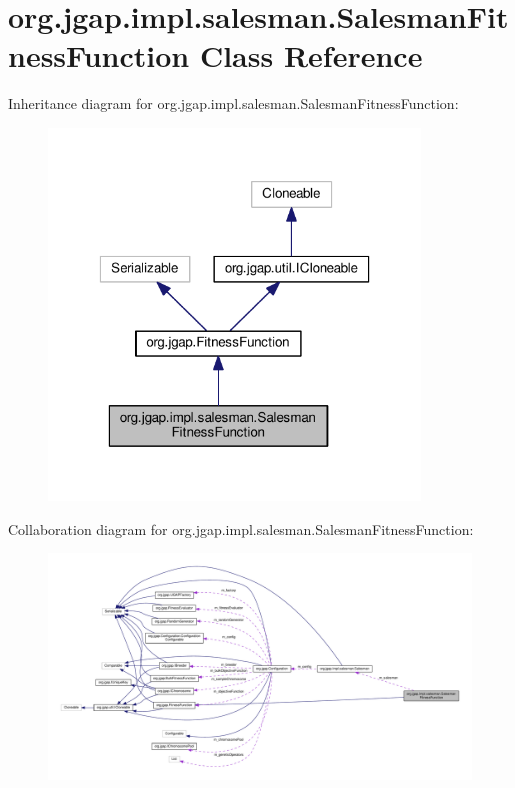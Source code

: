 \hypertarget{classorg_1_1jgap_1_1impl_1_1salesman_1_1_salesman_fitness_function}{\section{org.\-jgap.\-impl.\-salesman.\-Salesman\-Fitness\-Function Class Reference}
\label{classorg_1_1jgap_1_1impl_1_1salesman_1_1_salesman_fitness_function}
}


Inheritance diagram for org.\-jgap.\-impl.\-salesman.\-Salesman\-Fitness\-Function\-:
\nopagebreak
\begin{figure}[H]
\begin{center}
\leavevmode
\includegraphics[width=280pt]{classorg_1_1jgap_1_1impl_1_1salesman_1_1_salesman_fitness_function__inherit__graph}
\end{center}
\end{figure}


Collaboration diagram for org.\-jgap.\-impl.\-salesman.\-Salesman\-Fitness\-Function\-:
\nopagebreak
\begin{figure}[H]
\begin{center}
\leavevmode
\includegraphics[width=350pt]{classorg_1_1jgap_1_1impl_1_1salesman_1_1_salesman_fitness_function__coll__graph}
\end{center}
\end{figure}
